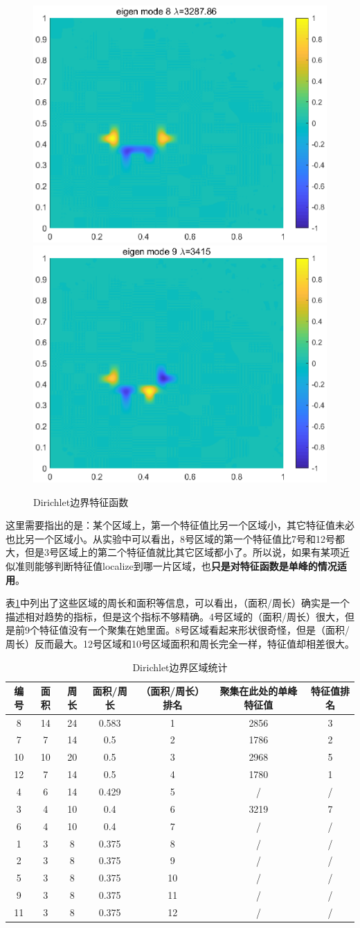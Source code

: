 \documentclass[12pt,a4paper]{article}
\begin{document}
\begin{figure}[htbp]
\includegraphics[width=0.3\linewidth]{pics/eigD8}
\includegraphics[width=0.3\linewidth]{pics/eigD9}
\caption{Dirichlet边界特征函数}
\label{eD}
\end{figure}

这里需要指出的是：某个区域上，第一个特征值比另一个区域小，其它特征值未必也比另一个区域小。从实验中可以看出，8号区域的第一个特征值比7号和12号都大，但是3号区域上的第二个特征值就比其它区域都小了。所以说，如果有某项近似准则能够判断特征值localize到哪一片区域，也\textbf{只是对特征函数是单峰的情况适用}。

表\ref{tD}中列出了这些区域的周长和面积等信息，可以看出，（面积/周长）确实是一个描述相对趋势的指标，但是这个指标不够精确。4号区域的（面积/周长）很大，但是前9个特征值没有一个聚集在她里面。8号区域看起来形状很奇怪，但是（面积/周长）反而最大。12号区域和10号区域面积和周长完全一样，特征值却相差很大。

\begin{table}
\centering
\begin{tabular}{c|c|c|c|c|c|c}
\hline
编号 & 面积 & 周长 & 面积/周长 & （面积/周长）排名 & 聚集在此处的单峰特征值 & 特征值排名 \\
\hline
8 & 14 & 24 & 0.583 & 1 & 2856 & 3 \\
7 & 7 & 14 & 0.5 & 2 & 1786 & 2 \\
10 & 10 & 20 & 0.5 & 3 & 2968 & 5 \\
12 & 7 & 14 & 0.5 & 4 & 1780 & 1 \\
4 & 6 & 14 & 0.429 & 5 & / & / \\
3 & 4 & 10 & 0.4 & 6 & 3219 & 7 \\
6 & 4 & 10 & 0.4 & 7 & / & / \\
1 & 3 & 8 & 0.375 & 8 & / & / \\
2 & 3 & 8 & 0.375 & 9 & / & / \\
5 & 3 & 8 & 0.375 & 10 & / & / \\
9 & 3 & 8 & 0.375 & 11 & / & / \\
11 & 3 & 8 & 0.375 & 12 & / & / \\
\hline 
\end{tabular}
\caption{Dirichlet边界区域统计}
\label{tD}
\end{table}
\end{document}
